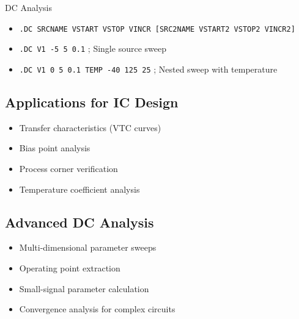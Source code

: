 \documentclass{beamer}
\begin{document}
\begin{frame}{DC Analysis}
    \begin{itemize}
        \item \texttt{.DC SRCNAME VSTART VSTOP VINCR [SRC2NAME VSTART2 VSTOP2 VINCR2]}
        \item \texttt{.DC V1 -5 5 0.1} ; Single source sweep
        \item \texttt{.DC V1 0 5 0.1 TEMP -40 125 25} ; Nested sweep with temperature
    \end{itemize}
    
    \subsection{Applications for IC Design}
    \begin{itemize}
        \item Transfer characteristics (VTC curves)
        \item Bias point analysis
        \item Process corner verification
        \item Temperature coefficient analysis
    \end{itemize}
    
    \subsection{Advanced DC Analysis}
    \begin{itemize}
        \item Multi-dimensional parameter sweeps
        \item Operating point extraction
        \item Small-signal parameter calculation
        \item Convergence analysis for complex circuits
    \end{itemize}
\end{frame}
\end{document}
